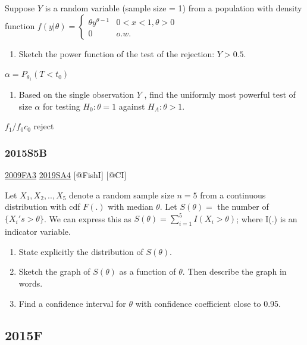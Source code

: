 \documentclass[6pt,Portrait]{article}
\providecommand{\tightlist}{%
  \setlength{\itemsep}{0pt}\setlength{\parskip}{0pt}}
\begin{document}
Suppose \(Y\) is a random variable (sample size = 1) from a population
with density function
\(f(y|\theta)=\begin{cases}\theta y^{\theta-1}& 0<x<1,\theta>0\\0& o.w.\end{cases}\)

\begin{enumerate}
\def\labelenumi{(\alph{enumi})}
\tightlist
\item
  Sketch the power function of the test of the rejection: \(Y>0.5\).
\end{enumerate}

\(\alpha=P_{\theta_1}(T<t_0)\)

\begin{enumerate}
\def\labelenumi{(\alph{enumi})}
\setcounter{enumi}{1}
\tightlist
\item
  Based on the single observation \(Y\) , find the uniformly most
  powerful test of size \(\alpha\) for testing \(H_0:\theta=1\) against
  \(H_A :\theta>1\).
\end{enumerate}

\(f_1/f_0c_0\) reject

\hypertarget{s5b-1}{%
\subsubsection{2015S5B}\label{s5b-1}}

\protect\hyperlink{fa3}{2009FA3} \protect\hyperlink{sa4-3}{2019SA4}
{[}@FishI{]} {[}@CI{]}

Let \(X_1,X_2,..,X_{5}\) denote a random sample size \(n=5\) from a
continuous distribution with cdf \(F(.)\) with median \(\theta\). Let
\(S(\theta)=\) the number of \(\{X_i's>\theta\}\). We can express this
as \(S(\theta)=\sum_{i=1}^5I(X_i>\theta)\); where I(.) is an indicator
variable.

\begin{enumerate}
\def\labelenumi{(\alph{enumi})}
\item
  State explicitly the distribution of \(S(\theta)\).
\item
  Sketch the graph of \(S(\theta)\) as a function of \(\theta\). Then
  describe the graph in words.
\item
  Find a confidence interval for \(\theta\) with confidence coefficient
  close to 0.95.
\end{enumerate}

\hypertarget{f-10}{%
\subsection{2015F}\label{f-10}}
\end{document}
